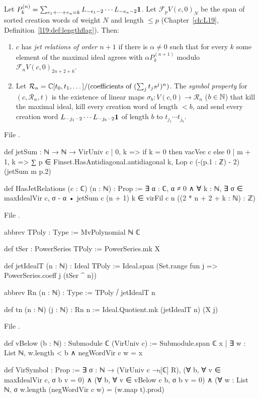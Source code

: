 \begin{definition}\label{l20:def:virinputs}
Let $P_k^{(n)}=\sum_{e_1+\dots+e_n=k}L_{-e_1-2}\cdots L_{-e_n-2}\mathbf{1}$. Let $\mathcal F_pV(c,0)_N$ be the span of sorted
creation words of weight $N$ and length $\le p$ (Chapter~\ref{ch:L19}, Definition~\ref{l19:def:lengthflag}). Then:
\begin{enumerate}
\item $c$ has \emph{jet relations of order $n+1$} if there is $\alpha\ne0$ such that for every $k$ some element of the maximal
  ideal agrees with $\alpha P_k^{(n+1)}$ modulo $\mathcal F_nV(c,0)_{2n+2+k}$.
\item Let $\mathcal R_n={\mathbb{C}}[t_0,t_1,\dots]/(\text{coefficients of }(\sum_jt_js^j)^n)$. The \emph{symbol property} for $(c,\mathcal R_n,t)$ is the existence
  of linear maps $\sigma_b\colon V(c,0)\to \mathcal R_n$ ($b\in{\mathbb{N}}$) that kill the maximal ideal, kill every creation word of length $<b$,
  and send every creation word $L_{-j_1-2}\cdots L_{-j_b-2}\mathbf{1}$ of length $b$ to $t_{j_1}\cdots t_{j_b}$.
\end{enumerate}
\end{definition}
\noindent File .
\begin{leancode}
def jetSum : ℕ → ℕ → VirUniv c
  | 0, k => if k = 0 then vacVec c else 0
  | m + 1, k => ∑ p ∈ Finset.HasAntidiagonal.antidiagonal k, Lop c (-(p.1 : ℤ) - 2) (jetSum m p.2)

def HasJetRelations (c : ℂ) (n : ℕ) : Prop :=
  ∃ α : ℂ, α ≠ 0 ∧ ∀ k : ℕ, ∃ σ ∈ maxIdealVir c,
    σ - α • jetSum c (n + 1) k ∈ virFil c n ((2 * n + 2 + k : ℕ) : ℤ)
\end{leancode}
\noindent File .
\begin{leancode}
abbrev TPoly : Type := MvPolynomial ℕ ℂ

def tSer : PowerSeries TPoly := PowerSeries.mk X

def jetIdealT (n : ℕ) : Ideal TPoly :=
  Ideal.span (Set.range fun j => PowerSeries.coeff j (tSer ^ n))

abbrev Rn (n : ℕ) : Type := TPoly ⧸ jetIdealT n

def tn (n : ℕ) (j : ℕ) : Rn n := Ideal.Quotient.mk (jetIdealT n) (X j)
\end{leancode}
\noindent File .
\begin{leancode}
def vBelow (b : ℕ) : Submodule ℂ (VirUniv c) :=
  Submodule.span ℂ {x | ∃ w : List ℕ, w.length < b ∧ negWordVir c w = x}

def VirSymbol : Prop :=
  ∃ σ : ℕ → (VirUniv c →ₗ[ℂ] R),
    (∀ b, ∀ v ∈ maxIdealVir c, σ b v = 0) ∧
    (∀ b, ∀ v ∈ vBelow c b, σ b v = 0) ∧
    (∀ w : List ℕ, σ w.length (negWordVir c w) = (w.map t).prod)
\end{leancode}


